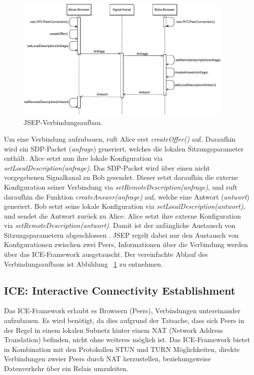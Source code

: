 \begin{figure}[h]
\centering
\includegraphics[width=0.95\textwidth]{bilder/PDF_SVG/JSEP.pdf}
\caption{\acs{JSEP}-Verbindungsaufbau.}
\label{fig:jsep}
\end{figure}

Um eine Verbindung aufzubauen, ruft Alice erst \textit{createOffer()} auf. Daraufhin wird ein SDP-Packet (\textit{anfrage}) generiert, welches die lokalen Sitzungsparameter enthält. Alice setzt nun ihre lokale Konfiguration via \textit{setLocalDescription(anfrage)}. Das \acs{SDP}-Packet wird über einen nicht vorgegebenen Signalkanal zu Bob gesendet. Dieser setzt daraufhin die externe Konfiguration seiner Verbindung via \textit{setRemoteDescription(anfrage)}, und ruft daraufhin die Funktion \textit{createAnswer(anfrage)} auf, welche eine Antwort (\textit{antwort}) generiert. Bob setzt seine lokale Konfiguration via \textit{setLocalDescription(antwort)}, und sendet die Antwort zurück zu Alice. Alice setzt ihre externe Konfiguration via \textit{setRemoteDescription(antwort)}. Damit ist der anfängliche Austausch von Sitzungsparametern abgeschlossen \cite{altanai2014}. \acs{JSEP} regelt dabei nur den Austausch von Konfigurationen zwischen zwei Peers, Informationen über die Verbindung werden über das \acs{ICE}-Framework ausgetauscht. Der vereinfachte Ablauf des Verbindungsaufbaus ist Abbildung ~\ref{fig:jsep} zu entnehmen.

\subsection{ICE: Interactive Connectivity Establishment}
Das \acf{ICE}-Framework erlaubt es Browsern (Peers), Verbindungen untereinander aufzubauen. Es wird benötigt, da dies aufgrund der Tatsache, dass sich Peers in der Regel in einem lokalen Subnetz hinter einem \acs{NAT} (Network Address Translation) befinden, nicht ohne weiteres möglich ist. Das \acs{ICE}-Framework bietet in Kombination mit den Protokollen \acs{STUN} und \acs{TURN} Möglichkeiten, direkte Verbindungen zweier Peers durch \acs{NAT} herzustellen, beziehungsweise Datenverkehr über ein Relais umzuleiten.\par


